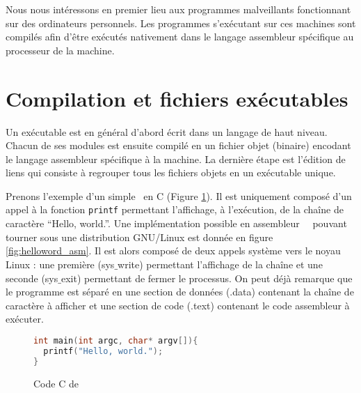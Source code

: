 
Nous nous intéressons en premier lieu aux programmes malveillants fonctionnant sur des ordinateurs personnels.
Les programmes s'exécutant sur ces machines sont compilés afin d'être exécutés nativement dans le langage assembleur spécifique au processeur de la machine.

\section{Compilation et fichiers exécutables}
Un exécutable est en général d'abord écrit dans un langage de haut niveau. Chacun de ses modules est ensuite compilé en un fichier objet (binaire) encodant le langage assembleur spécifique à la machine. La dernière étape est l'édition de liens qui consiste à regrouper tous les fichiers objets en un exécutable unique.

Prenons l'exemple d'un simple \helloworld\ en C (Figure \ref{fig:helloword_c}). Il est uniquement composé d'un appel à la fonction \texttt{printf} permettant l'affichage, à l'exécution, de la chaîne de caractère ``Hello, world.''.
Une implémentation possible en assembleur \nasm\ \xq\ pouvant tourner sous une distribution GNU/Linux est donnée en figure \ref{fig:helloword_asm}. Il est alors composé de deux appels système vers le noyau Linux : une première (sys$\_$write) permettant l'affichage de la chaîne et une seconde (sys$\_$exit) permettant de fermer le processus. On peut déjà remarque que le programme est séparé en une section de données (.data) contenant la chaîne de caractère à afficher et une section de code (.text) contenant le code assembleur à exécuter.
\begin{figure}
\begin{lstlisting}[language={C}]
int main(int argc, char* argv[]){
  printf("Hello, world.");
}
\end{lstlisting}
\caption{Code C de \helloworld}
\label{fig:helloword_c}
\end{figure}


